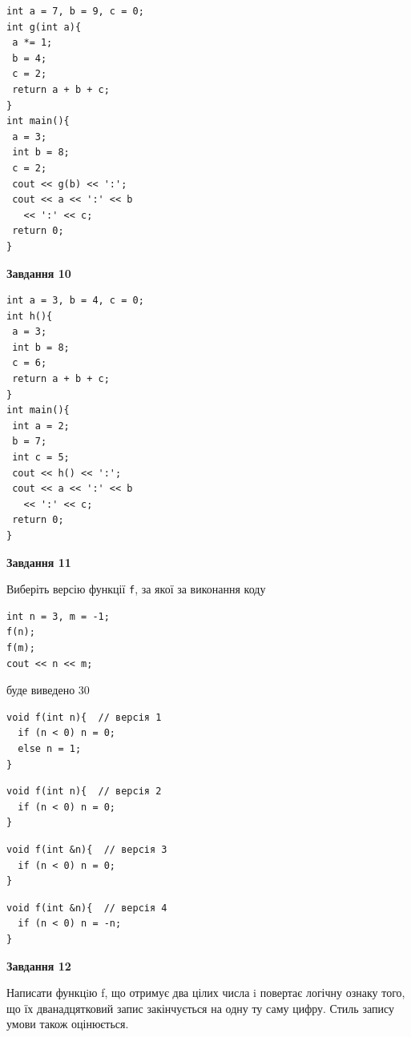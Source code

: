 \documentclass[12pt, ukrainian]{article}
\def\code#1{\Verb!#1!}
\begin{document}
{\begin {large}
\begin{minipage}[t]{7.0cm}
\begin{verbatim}
int a = 7, b = 9, c = 0;
int g(int a){
 a *= 1;
 b = 4;
 c = 2;
 return a + b + c;
}
int main(){
 a = 3;
 int b = 8;
 c = 2;
 cout << g(b) << ':';
 cout << a << ':' << b 
   << ':' << c;
 return 0;
}
\end{verbatim}



\begin{center}
\textbf{Завдання 10}
\end{center}
\vspace{-8mm}

\begin{verbatim}
int a = 3, b = 4, c = 0;
int h(){
 a = 3;
 int b = 8;
 c = 6;
 return a + b + c;
}
int main(){
 int a = 2;
 b = 7;
 int c = 5;
 cout << h() << ':';
 cout << a << ':' << b 
   << ':' << c;
 return 0;
}
\end{verbatim}

\end{minipage}
\vline \hspace{1mm}
\begin{minipage}[t]{11.0cm}

\begin{center}
\textbf{Завдання 11}
\end{center}
Виберіть версію функції \code{f}, за якої за виконання коду
\begin{verbatim}
int n = 3, m = -1;
f(n);
f(m);
cout << n << m;
\end{verbatim}

буде виведено 30

\begin{verbatim}
void f(int n){  // версія 1
  if (n < 0) n = 0;
  else n = 1;
}
\end{verbatim}

\vspace{-8mm}\begin{verbatim}
void f(int n){  // версія 2
  if (n < 0) n = 0;
}
\end{verbatim}

\vspace{-8mm}\begin{verbatim}
void f(int &n){  // версія 3
  if (n < 0) n = 0;
}
\end{verbatim}

\vspace{-8mm}\begin{verbatim}
void f(int &n){  // версія 4
  if (n < 0) n = -n;
}
\end{verbatim}



\begin{center}
\textbf{Завдання 12}
\end{center}

Написати функцiю f, що отримує два цілих числа i повертає логічну ознаку того, що їх дванадцятковий запис закінчується на одну ту саму цифру. Стиль запису умови також оцінюється.\par

\end{minipage}

\end {large}}
\newpage
\end{document}
